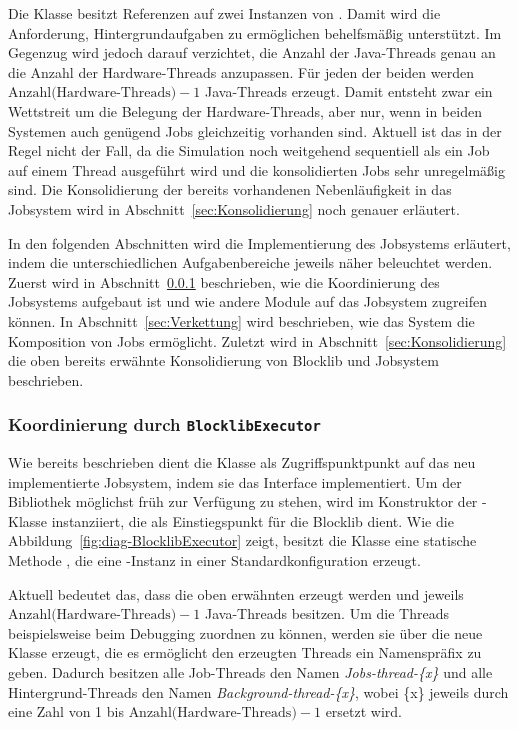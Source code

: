 Die Klasse \classBlocklibExecutor{} besitzt Referenzen auf zwei Instanzen von \classScheduledThreadPoolExecutor{}. Damit wird die Anforderung, Hintergrundaufgaben zu ermöglichen behelfsmäßig unterstützt. Im Gegenzug wird jedoch darauf verzichtet, die Anzahl der Java-Threads genau an die Anzahl der Hardware-Threads anzupassen. Für jeden der beiden \classScheduledThreadPoolExecutor{} werden $\text{Anzahl(Hardware-Threads)} - 1$ Java-Threads erzeugt. Damit entsteht zwar ein Wettstreit um die Belegung der Hardware-Threads, aber nur, wenn in beiden Systemen auch genügend Jobs gleichzeitig vorhanden sind. Aktuell ist das in der Regel nicht der Fall, da die Simulation noch weitgehend sequentiell als ein Job auf einem Thread ausgeführt wird und die konsolidierten Jobs sehr unregelmäßig sind. Die Konsolidierung der bereits vorhandenen Nebenläufigkeit in das Jobsystem wird in Abschnitt~\ref{sec:Konsolidierung} noch genauer erläutert. 

In den folgenden Abschnitten wird die Implementierung des Jobsystems erläutert, indem die unterschiedlichen Aufgabenbereiche jeweils näher beleuchtet werden. Zuerst wird in Abschnitt~\ref{sec:Koordinierung} beschrieben, wie die Koordinierung des Jobsystems aufgebaut ist und wie andere Module auf das Jobsystem zugreifen können. In Abschnitt~\ref{sec:Verkettung} wird beschrieben, wie das System die Komposition von Jobs ermöglicht. Zuletzt wird in Abschnitt~\ref{sec:Konsolidierung} die oben bereits erwähnte Konsolidierung von Blocklib und Jobsystem beschrieben.

\subsubsection{Koordinierung durch \texttt{BlocklibExecutor}}\label{sec:Koordinierung}

Wie bereits beschrieben dient die Klasse \classBlocklibExecutor{} als Zugriffspunktpunkt auf das neu implementierte Jobsystem, indem sie das Interface \classBlocklibExecutorService{} implementiert. Um der Bibliothek möglichst früh zur Verfügung zu stehen, wird \classBlocklibExecutor{} im Konstruktor der \classGame{}-Klasse instanziiert, die als Einstiegspunkt für die Blocklib dient. Wie die Abbildung~\ref{fig:diag-BlocklibExecutor} zeigt, besitzt die Klasse \classBlocklibExecutor{} eine statische Methode , die eine \classBlocklibExecutor{}-Instanz in einer Standardkonfiguration erzeugt.

Aktuell bedeutet das, dass die oben erwähnten \classScheduledThreadPoolExecutor{} erzeugt werden und jeweils $\text{Anzahl(Hardware-Threads)} - 1$ Java-Threads besitzen. Um die Threads beispielsweise beim Debugging zuordnen zu können, werden sie über die neue Klasse \classNamedThreadFactory{} erzeugt, die es ermöglicht den erzeugten Threads ein Namenspräfix zu geben. Dadurch besitzen alle Job-Threads den Namen \emph{Jobs-thread-\{x\}} und alle Hintergrund-Threads den Namen \emph{Background-thread-\{x\}}, wobei \{x\} jeweils durch eine Zahl von 1 bis $\text{Anzahl(Hardware-Threads)} - 1$ ersetzt wird.

